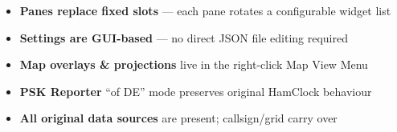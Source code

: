 \documentclass[twocolumn,9pt,letterpaper]{article}
\begin{document}
\begin{minipage}[t]{0.495\linewidth}
  \begin{mdframed}[style=migbox]
    {\color{hclight}\footnotesize
    \begin{itemize}[leftmargin=1em,itemsep=2pt,topsep=0pt,parsep=0pt]
      \item \textbf{Panes replace fixed slots} --- each pane rotates a configurable widget list
      \item \textbf{Settings are GUI-based} --- no direct JSON file editing required
      \item \textbf{Map overlays \& projections} live in the right-click Map View Menu
      \item \textbf{PSK Reporter} ``of DE'' mode preserves original HamClock behaviour
      \item \textbf{All original data sources} are present; callsign/grid carry over
    \end{itemize}
    }
  \end{mdframed}

\end{minipage}
\hfill
\end{document}
